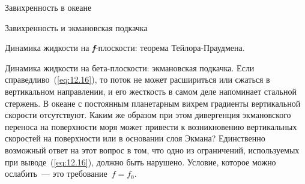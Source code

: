 \begin{chapter}{Завихренность в океане}
\begin{section}{Завихренность и экмановская подкачка}
\begin{paragraph}{Динамика жидкости на \textbf{\textit{f}}-плоскости: 
теорема Тейлора-Праудмена.}
\end{paragraph}

\begin{paragraph}{Динамика жидкости на бета-плоскости: экмановская подкачка.}
%
%
Если справедливо~(\ref{eq:12.16}), то поток не может расшириться 
или сжаться в вертикальном направлении, и его жесткость в самом деле
напоминает стальной стержень. В океане с постоянным планетарным вихрем
градиенты вертикальной скорости отсутствуют. Каким же образом при этом
дивергенция экмановского переноса на поверхности моря 
может привести к возникновению вертикальных скоростей на поверхности 
или в основании слоя Экмана? Единственно возможный ответ на этот вопрос в том,
что одно из ограничений, используемых при выводе~(\ref{eq:12.16}), должно 
быть нарушено. Условие, которое можно ослабить~--- это требование~$f = f_0$. 
%


\end{paragraph}
\end{section}
\end{chapter}
